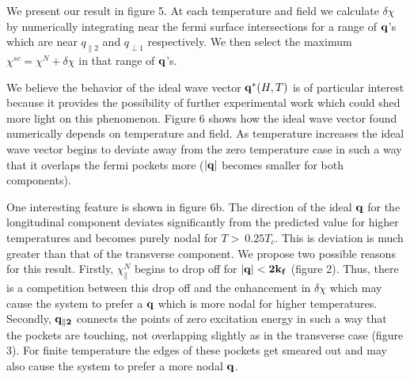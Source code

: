 \documentclass[usletter,aps,prb,10pt,amssymb,amsmath,twocolumn]{revtex4-1}
\begin{document}
%
%
%
%
 
 
 
 

We present our result in figure 5. At each temperature and field we calculate $\delta \chi$ by numerically integrating near the fermi surface intersections for a range of $\bf q$'s which are near $q_{\parallel 2}$ and $q_{\perp 1}$ respectively.  We then select the maximum $\chi^{sc}=\chi^N+\delta\chi$ in that range of $\bf q$'s.

 
We believe the behavior of the ideal wave vector ${\bf q}^*(H,T)$ is of particular interest because it provides the possibility of further experimental work which could shed more light on this phenomenon. Figure 6 shows how the ideal wave vector found numerically depends on temperature and field.  As temperature increases the ideal wave vector begins to deviate away from the zero temperature case in such a way that it overlaps the fermi pockets more ($|\bf{q}|$ becomes smaller for both components). 

One interesting feature is shown in figure 6b. The direction of the ideal $\bf q$ for the longitudinal component deviates significantly from the predicted value for higher temperatures and becomes purely nodal for $T>~0.25T_c$. This is deviation is much greater than that of the transverse component. We propose two possible reasons for this result. Firstly, $\chi^N_{\parallel}$ begins to drop off for $|\bf{q}|<2k_f$ (figure 2). Thus, there is a competition between this drop off and the enhancement in $\delta \chi$ which may cause the system to prefer a $\bf q$ which is more nodal for higher temperatures. Secondly, $\bf{q}_{\parallel 2}$ connects the points of zero excitation energy in such a way that the pockets are touching, not overlapping slightly as in the transverse case (figure 3). For finite temperature the edges of these pockets get smeared out and may also cause the system to prefer a more nodal $\bf q$.
\end{document}
